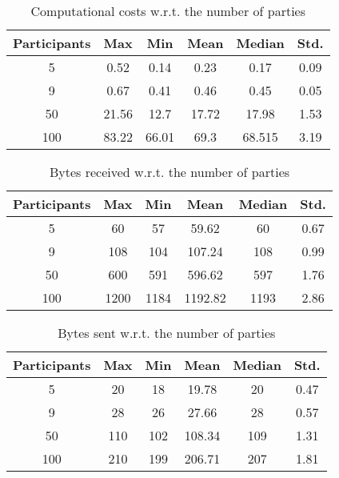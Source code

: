 \documentclass[9pt,conference]{IEEEtran}
\begin{document}
\begin{table}[H]
\caption{Computational costs w.r.t. the number of parties} %
\centering %
\begin{tabular}{c c c c c c} %
\hline\hline %
Participants & Max & Min & Mean & Median & Std.\\ [0.5ex] %
\hline %
5 & 0.52 & 0.14  & 0.23 & 0.17 & 0.09  \\ %
9 & 0.67  & 0.41  & 0.46 & 0.45 & 0.05  \\
50 & 21.56 &  12.7 & 17.72 & 17.98 & 1.53  \\
100 & 83.22 & 66.01  & 69.3 & 68.515 & 3.19  \\ [1ex] %
\hline %
\end{tabular}
\label{table:numberpartycc} %
\end{table}

\begin{table}[H]
\caption{Bytes received w.r.t. the number of parties} %
\centering %
\begin{tabular}{c c c c c c} %
\hline\hline %
Participants & Max & Min & Mean & Median & Std.\\ [0.5ex] %
\hline %
5 & 60  & 57 & 59.62 & 60 & 0.67  \\ %
9 & 108  & 104 & 107.24 & 108 & 0.99   \\
50 & 600 & 591  & 596.62 & 597 & 1.76 \\
100 & 1200 & 1184  & 1192.82 & 1193 & 2.86\\ [1ex] %
\hline %
\end{tabular}
\label{table:numberpartyrb} %
\end{table}

\begin{table}[H]
\caption{Bytes sent w.r.t. the number of parties} %
\centering %
\begin{tabular}{c c c c c c} %
\hline\hline %
Participants & Max & Min & Mean & Median & Std.\\ [0.5ex] %
\hline %
5 & 20 & 18 & 19.78 & 20 & 0.47  \\ %
9 & 28  & 26 & 27.66 & 28 &  0.57  \\
50 & 110  & 102  & 108.34 & 109 & 1.31  \\
100 & 210 & 199 & 206.71 & 207 & 1.81  \\ [1ex] %
\hline %
\end{tabular}
\label{table:numberpartysb} %
\end{table}
\end{document}
